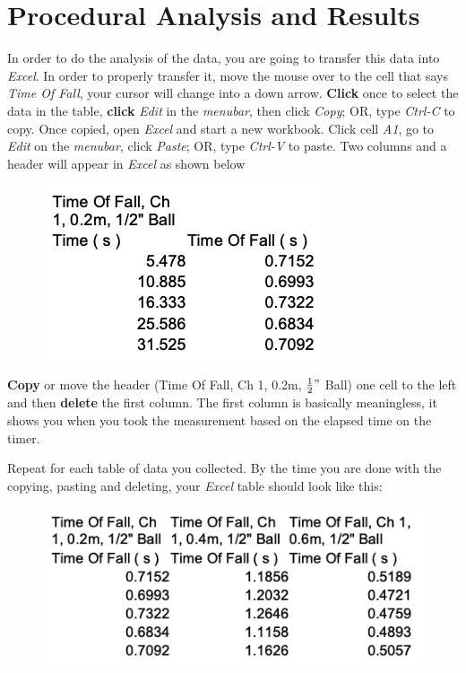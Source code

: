 \section{Procedural Analysis and Results}

In order to do the analysis of the data, you are going to transfer this data into \emph{Excel}. In
order to properly transfer it, move the mouse over to the cell that says \emph{Time Of Fall}, your cursor
will change into a down arrow. \textbf{Click} once to select the data in the table, \textbf{click} \emph{Edit} in the \emph{menubar},
then click \emph{Copy}; OR, type \emph{Ctrl-C} to copy. Once copied, open \emph{Excel} and start a new workbook.
Click cell \emph{A1}, go to \emph{Edit} on the \emph{menubar}, click \emph{Paste}; OR, type \emph{Ctrl-V} to paste. Two columns and a
header will appear in \emph{Excel} as shown below

\begin{figure}[h!]
  \centerline{\includegraphics[scale=0.45]{resources/photo10.png}}
\end{figure}

\textbf{Copy} or move the header (Time Of Fall, Ch 1, 0.2m, $\frac{1}{2}"$ Ball) one cell to the left and then
\textbf{delete} the first column. The first column is basically meaningless, it shows you when you took the
measurement based on the elapsed time on the timer.
  
  Repeat for each table of data you collected. By the time you are done with the copying,
pasting and deleting, your \emph{Excel} table should look like this:

\begin{figure}[h!]
  \centerline{\includegraphics[scale=0.45]{resources/photo11.png}}
\end{figure}

